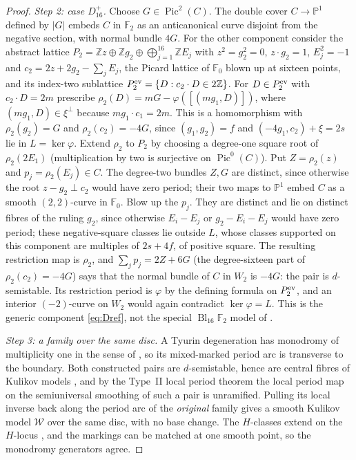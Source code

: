 \documentclass[12pt]{article}
\newcommand{\Z}{\mathbb Z}
\newcommand{\PP}{\mathbb P}
\newcommand{\F}{\mathbb F}
\newcommand{\Pic}{\operatorname{Pic}}
\newcommand{\Bl}{\operatorname{Bl}}
\newcommand{\calW}{\mathcal W}
\theoremstyle{definition}
\theoremstyle{remark}
\begin{document}
\begin{proof}
\emph{Step 2: case \(D_{16}^+\).}
Choose \(G\in\Pic^2(C)\). The double cover \(C\to\PP^1\) defined by
\(|G|\) embeds \(C\) in \(\F_2\) as an anticanonical curve disjoint
from the negative section, with normal bundle \(4G\). For the other
component consider the abstract lattice
\(P_2=\Z z\oplus\Z g_2\oplus\bigoplus_{j=1}^{16}\Z E_j\) with
\(z^2=g_2^2=0\), \(z\cdot g_2=1\), \(E_j^2=-1\) and
\(c_2=2z+2g_2-\sum_jE_j\),
the Picard lattice of \(\F_0\) blown up at sixteen points, and its
index-two sublattice \(P_2^{\rm ev}=\{D: c_2\cdot D\in2\Z\}\). For
\(D\in P_2^{\rm ev}\) with \(c_2\cdot D=2m\) prescribe
\(\rho_2(D)=mG-\varphi([(mg_1,D)])\), where \((mg_1,D)\in\xi^\perp\)
because \(mg_1\cdot c_1=2m\). This is a homomorphism with
\(\rho_2(g_2)=G\) and \(\rho_2(c_2)=-4G\), since \((g_1,g_2)=f\) and
\((-4g_1,c_2)+\xi=2s\) lie in \(L=\ker\varphi\). Extend \(\rho_2\) to
\(P_2\) by choosing a degree-one square root of \(\rho_2(2E_1)\)
(multiplication by two is surjective on \(\Pic^0(C)\)). Put
\(Z=\rho_2(z)\) and \(p_j=\rho_2(E_j)\in C\). The degree-two bundles
\(Z,G\) are distinct, since otherwise the root \(z-g_2\perp c_2\)
would have zero period; their two maps to \(\PP^1\) embed \(C\) as a
smooth \((2,2)\)-curve in \(\F_0\). Blow up the \(p_j\). They are
distinct and lie on distinct fibres of the ruling \(g_2\), since
otherwise \(E_i-E_j\) or \(g_2-E_i-E_j\) would have zero period; these
negative-square classes lie outside \(L\), whose classes supported on
this component are multiples of \(2s+4f\), of positive square. The
resulting restriction map is \(\rho_2\), and \(\sum_jp_j=2Z+6G\) (the
degree-sixteen part of \(\rho_2(c_2)=-4G\)) says that the normal
bundle of \(C\) in \(W_2\) is \(-4G\): the pair is \(d\)-semistable.
Its restriction period is \(\varphi\) by the defining formula on
\(P_2^{\rm ev}\), and an interior \((-2)\)-curve on \(W_2\) would again
contradict \(\ker\varphi=L\). This is the generic component
\eqref{eq:Dref}, not the special \(\Bl_{16}\F_2\) model of
\cite[\S7F]{ABE}.

\emph{Step 3: a family over the same disc.}
A Tyurin degeneration has monodromy of multiplicity one in the sense
of \cite[Theorem~3.13]{AE}, so its mixed-marked period arc is
transverse to the boundary. Both constructed pairs are
\(d\)-semistable, hence are central fibres of Kulikov models
\cite{Fr83}, and by the Type~II local period theorem
\cite[Theorem~7.1, Corollary~7.24]{AE} the local period map on the
semiuniversal smoothing of such a pair is unramified. Pulling its
local inverse back along the period arc of the \emph{original} family
gives a smooth Kulikov model \(\calW\) over the same disc, with no base
change. The \(H\)-classes extend on the \(H\)-locus \cite[\S7E]{AE},
and the markings can be matched at one smooth point, so the monodromy
generators agree.


\end{proof}
\end{document}
